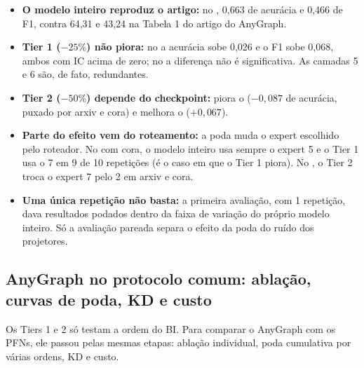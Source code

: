 \documentclass[12pt,a4paper]{article}
\begin{document}
\begin{itemize}
  \item \textbf{O modelo inteiro reproduz o artigo:} no , 0,663 de acurácia e 0,466 de F1, contra 64,31 e 43,24 na Tabela 1 do artigo do AnyGraph.
  \item \textbf{Tier 1 ($-25\%$) não piora:} no  a acurácia sobe 0,026 e o F1 sobe 0,068, ambos com IC acima de zero; no  a diferença não é significativa. As camadas 5 e 6 são, de fato, redundantes.
  \item \textbf{Tier 2 ($-50\%$) depende do checkpoint:} piora o  ($-0{,}087$ de acurácia, puxado por arxiv e cora) e melhora o  ($+0{,}067$).
  \item \textbf{Parte do efeito vem do roteamento:} a poda muda o expert escolhido pelo roteador. No  com cora, o modelo inteiro usa sempre o expert 5 e o Tier 1 usa o 7 em 9 de 10 repetições (é o caso em que o Tier 1 piora). No , o Tier 2 troca o expert 7 pelo 2 em arxiv e cora.
  \item \textbf{Uma única repetição não basta:} a primeira avaliação, com 1 repetição, dava resultados podados dentro da faixa de variação do próprio modelo inteiro. Só a avaliação pareada separa o efeito da poda do ruído dos projetores.
\end{itemize}

\subsection{AnyGraph no protocolo comum: ablação, curvas de poda, KD e custo}
\label{sec:any-fases}

Os Tiers 1 e 2 só testam a ordem do BI. Para comparar o AnyGraph com os PFNs, ele passou pelas mesmas etapas: ablação individual, poda cumulativa por várias ordens, KD e custo.
\end{document}
